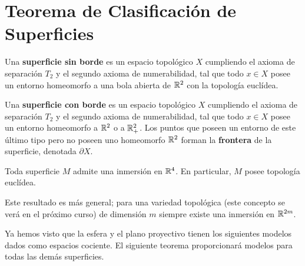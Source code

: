 \documentclass[GTSResumen.tex]{subfiles}
\begin{document}
\section{Teorema de Clasificación de Superficies}

\begin{defi} Una \textbf{superficie sin borde} es un espacio topológico $X$ cumpliendo el axioma de separación $T_2$ y el segundo axioma de numerabilidad, tal que todo $x\in X$ posee un entorno homeomorfo a una bola abierta de $\mathbb{R}^2$ con la topología euclídea.
\end{defi}

\begin{defi} Una \textbf{superficie con borde} es un espacio topológico $X$ cumpliendo el axioma de separación $T_2$ y el segundo axioma de numerabilidad, tal que todo $x\in X$ posee un entorno homeomorfo a $\mathbb{R}^2$ o a $\mathbb{R}^2_+$. Los puntos que poseen un entorno de este último tipo pero no poseen uno homeomorfo $\mathbb{R}^2$ forman la \textbf{frontera} de la superficie, denotada $\partial X$.
\end{defi}

\begin{teorema} Toda superficie $M$ admite una inmersión en $\mathbb{R}^4$. En particular, $M$ posee topología euclídea. 
\end{teorema}

\begin{nota} Este resultado es más general; para una variedad topológica (este concepto se verá en el próximo curso) de dimensión $m$ siempre existe una inmersión en $\mathbb{R}^{2m}$.
\end{nota}



Ya hemos visto que la esfera y el plano proyectivo tienen los siguientes modelos dados como espacios cociente. El siguiente teorema proporcionará modelos para todas las demás superficies.
\end{document}

